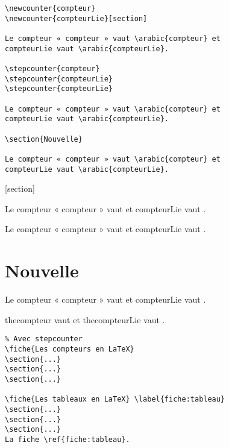 \documentclass[fontsize=12pt,twoside=false,parskip=half,notitlepage,DIV=17,french]{scrbook}
\begin{document}
   \begin{verbatim}
\newcounter{compteur}
\newcounter{compteurLie}[section]

Le compteur « compteur » vaut \arabic{compteur} et
compteurLie vaut \arabic{compteurLie}.

\stepcounter{compteur}
\stepcounter{compteurLie}
\stepcounter{compteurLie}

Le compteur « compteur » vaut \arabic{compteur} et
compteurLie vaut \arabic{compteurLie}.

\section{Nouvelle}

Le compteur « compteur » vaut \arabic{compteur} et
compteurLie vaut \arabic{compteurLie}.
\end{verbatim}

[section]

Le compteur « compteur » vaut  et
compteurLie vaut .


Le compteur « compteur » vaut  et
compteurLie vaut .

\section{Nouvelle}

Le compteur « compteur » vaut  et
compteurLie vaut .

thecompteur vaut \thecompteur{} et thecompteurLie vaut \thecompteurLie.


\newpage


\setcounter{section}{0}
\setcounter{subsection}{0}

\begin{verbatim}
% Avec stepcounter
\fiche{Les compteurs en LaTeX}
\section{...}
\section{...}
\section{...}

\fiche{Les tableaux en LaTeX} \label{fiche:tableau}
\section{...}
\section{...}
\section{...}
La fiche \ref{fiche:tableau}.
\end{verbatim}
\end{document}
